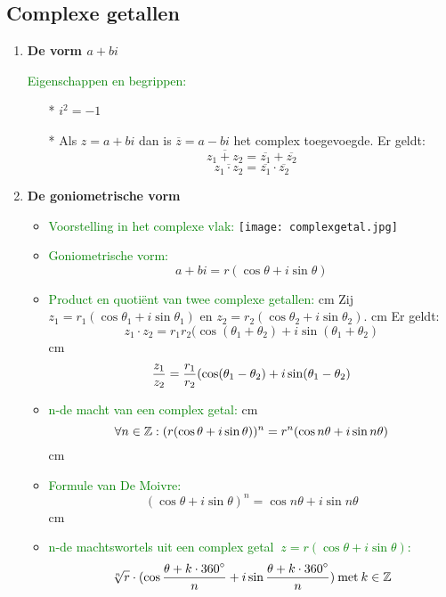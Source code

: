 \subsection{Complexe getallen} \label{complexe_getallen}
\hypertarget{complexe_getallen}{}
\begin{enumerate}%
\item \hypertarget{vorm_a_plus_bi}{{\bf De vorm $a + bi$}}\label{vorm_a_plus_bi}\vskip 0.3cm
\textcolor{green}{Eigenschappen en begrippen:}\newline
\begin{itemize} %
\item[*] $i^2=-1$
\item[*] Als $z=a+bi$ dan is $\overline{z}=a-bi$ het complex toegevoegde. \newline
		Er geldt:
		\[\overline{z_1+z_2}=\overline{z_1}+\overline{z_2}\]
		\[\overline{z_1\cdot z_2}=\overline{z_1}\cdot\overline{z_2}\]
\end{itemize}%
\item {\bf De goniometrische vorm}
\begin{itemize}
\item\textcolor{green}{Voorstelling in het complexe vlak:}\newline
\texttt{[image: complexgetal.jpg]}
\item\textcolor{green}{\hypertarget{goniometrische_vorm}{Goniometrische vorm:}}\label{goniometrische_vorm}
		\[a+bi=r(\cos\theta +i\sin\theta)\]
\item\textcolor{green}{Product en quoti\"ent van twee complexe getallen:} cm
Zij $z_1=r_1(\cos\theta_1 +i\sin\theta_1)$ en $z_2=r_2(\cos\theta_2+i\sin\theta_2)$. cm Er geldt:
\[z_1\cdot z_2=r_1r_2(\cos(\theta_1+\theta_2)+i\sin(\theta_1+\theta_2)\]  cm
\[\displaystyle\frac{\displaystyle z_1}{\displaystyle z_2}=\displaystyle\frac{\displaystyle r_1}{\displaystyle r_2}(\cos(\theta_1-\theta_2)+i\sin(\theta_1-\theta_2)\]
\item\textcolor{green}{n-de macht van een complex getal:} cm
\[\forall n\in \mathbb{Z}: (r(\cos\theta+i\sin\theta))^n=r^n(\cos n\theta + i\sin n\theta)\] cm
\item\textcolor{green}{Formule van De Moivre:}
\[(\cos \theta +i\sin\theta)^n=\cos n\theta+i\sin n \theta\] cm
\item\textcolor{green}{n-de machtswortels uit een complex getal $\:z=r(\cos\theta+i\sin\theta)$:}
\[\sqrt[n]{r}\cdot(\cos\displaystyle\frac{\displaystyle \theta+k\cdot 360^{\circ}}{\displaystyle n}+i\sin\displaystyle\frac{\displaystyle \theta+k\cdot360^{\circ}}{\displaystyle n})\: \mbox{met}\: k\in \mathbb{Z}\]

\end{itemize}
\end{enumerate}
